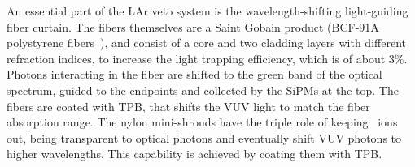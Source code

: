 An essential part of the LAr veto system is the wavelength-shifting light-guiding fiber
curtain. The fibers themselves are a Saint Gobain product (BCF-91A polystyrene
fibers~\cite{FibersData}), and consist of a core and two cladding layers with different
refraction indices, to increase the light trapping efficiency, which is of about 3\%.
Photons interacting in the fiber are shifted to the green band of the optical spectrum,
guided to the endpoints and collected by the SiPMs at the top. The fibers are coated with
TPB, that shifts the VUV light to match the fiber absorption range.
\newpar
The nylon mini-shrouds have the triple role of keeping \kvz\ ions out, being transparent
to optical photons and eventually shift VUV photons to higher wavelengths. This capability
is achieved by coating them with TPB.

